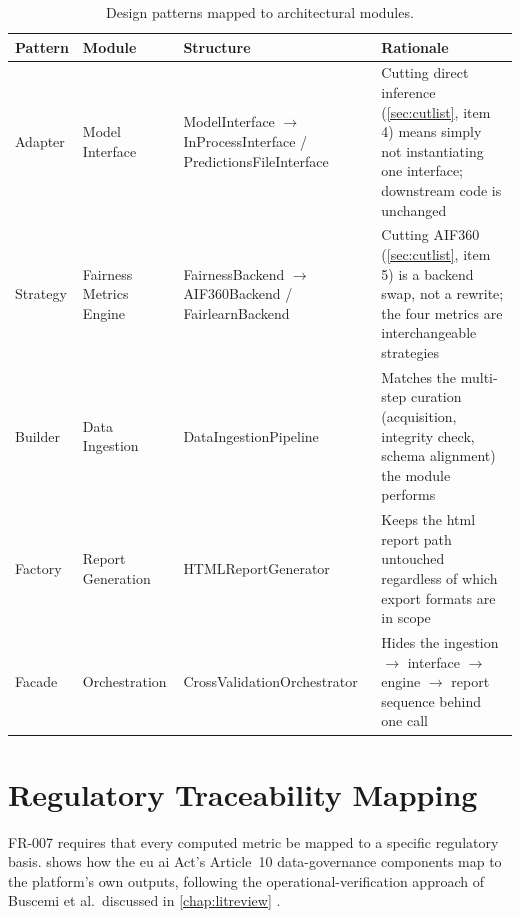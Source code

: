 \begin{table}[htbp]
    \centering
    \renewcommand{\arraystretch}{1.3}
    \caption{Design patterns mapped to architectural modules.}
    \label{tab:patterns}
    \begin{tabular}{p{2cm}p{2.6cm}p{4.1cm}p{5.5cm}}
        \toprule
        \textbf{Pattern} & \textbf{Module} & \textbf{Structure} & \textbf{Rationale} \\
        \midrule
        Adapter & Model Interface & {\ttfamily\footnotesize Model\-Interface} $\to$ {\ttfamily\scriptsize In\-Process\-Interface} / {\ttfamily\scriptsize Predictions\-File\-Interface} & Cutting direct inference (\cref{sec:cutlist}, item 4) means simply not instantiating one interface; downstream code is unchanged \\
        Strategy & Fairness Metrics Engine & {\ttfamily\footnotesize Fairness\-Backend} $\to$ {\ttfamily\footnotesize AIF360Backend} / {\ttfamily\footnotesize Fairlearn\-Backend} & Cutting AIF360 (\cref{sec:cutlist}, item 5) is a backend swap, not a rewrite; the four metrics are interchangeable strategies \\
        Builder & Data Ingestion & {\ttfamily\footnotesize Data\-Ingestion\-Pipeline} & Matches the multi-step curation (acquisition, integrity check, schema alignment) the module performs \\
        Factory & Report Generation & {\ttfamily\footnotesize HTMLReport\-Generator} & Keeps the \gls{html} report path untouched regardless of which export formats are in scope \\
        Facade & Orchestration & {\ttfamily\footnotesize Cross\-Validation\-Orchestrator} & Hides the ingestion $\to$ interface $\to$ engine $\to$ report sequence behind one call \\
        \bottomrule
    \end{tabular}
\end{table}

\section{Regulatory Traceability Mapping}
\label{sec:regmapping}

FR-007 requires that every computed metric be mapped to a specific regulatory basis.  shows how the \gls{eu} \gls{ai} Act's Article~10 data-governance components map to the platform's own outputs, following the operational-verification approach of Buscemi et al.\ discussed in \cref{chap:litreview} \cite{buscemi2025assessing,euaiact2024}.

